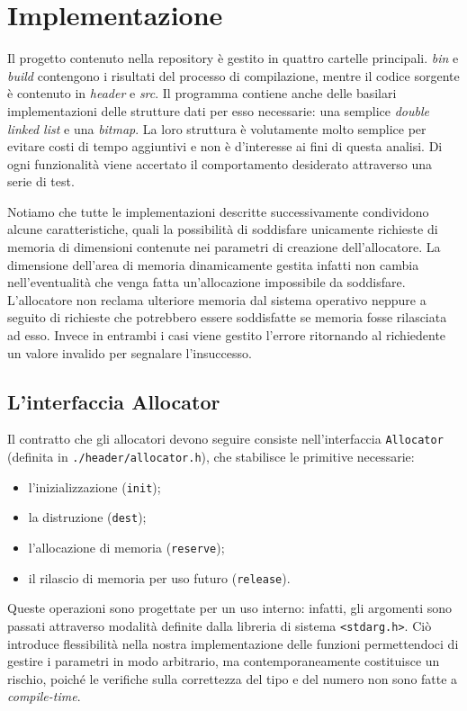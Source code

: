 \chapter{Implementazione}
Il progetto contenuto nella repository è gestito in quattro cartelle principali. \textit{bin} e \textit{build} contengono i risultati del processo di compilazione, mentre il codice sorgente è contenuto in \textit{header} e \textit{src}. Il programma contiene anche delle basilari implementazioni delle strutture dati per esso necessarie: una semplice \textit{double linked list} e una \textit{bitmap}. La loro struttura è volutamente molto semplice per evitare costi di tempo aggiuntivi e non è d’interesse ai fini di questa analisi. Di ogni funzionalità viene accertato il comportamento desiderato attraverso una serie di test.

Notiamo che tutte le implementazioni descritte successivamente condividono alcune caratteristiche, quali la possibilità di soddisfare unicamente richieste di memoria di dimensioni contenute nei parametri di creazione dell'allocatore. La dimensione dell’area di memoria dinamicamente gestita infatti non cambia nell’eventualità che venga fatta un’allocazione impossibile da soddisfare. L’allocatore non reclama ulteriore memoria dal sistema operativo neppure a seguito di richieste che potrebbero essere soddisfatte se memoria fosse rilasciata ad esso. Invece in entrambi i casi viene gestito l’errore ritornando al richiedente un valore invalido per segnalare l’insuccesso.

\section{L’interfaccia Allocator}
Il contratto che gli allocatori devono seguire consiste nell’interfaccia \texttt{Allocator} (definita in \texttt{./header/allocator.h}), che stabilisce le primitive necessarie:
\begin{itemize}
    \item l’inizializzazione (\texttt{init});
    \item la distruzione (\texttt{dest});
    \item l’allocazione di memoria (\texttt{reserve});
    \item il rilascio di memoria per uso futuro (\texttt{release}).
\end{itemize}


Queste operazioni sono progettate per un uso interno: infatti, gli argomenti sono passati attraverso modalità definite dalla libreria di sistema \texttt{<stdarg.h>}. Ciò introduce flessibilità nella nostra implementazione delle funzioni permettendoci di gestire i parametri in modo arbitrario, ma contemporaneamente costituisce un rischio, poiché le verifiche sulla correttezza del tipo e del numero non sono fatte a \textit{compile-time}.

